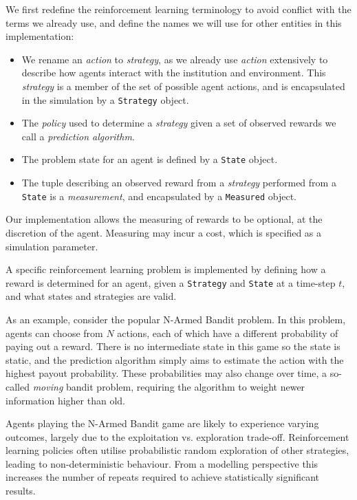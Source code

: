 We first redefine the reinforcement learning terminology to avoid conflict with the terms we already use, and define the names we will use for other entities in this implementation:
\begin{itemize}
\item We rename an \emph{action} to \emph{strategy}, as we already use \emph{action} extensively to describe how agents interact with the institution and environment. This \emph{strategy} is a member of the set of possible agent actions, and is encapsulated in the simulation by a \texttt{Strategy} object.
\item The \emph{policy} used to determine a \emph{strategy} given a set of observed rewards we call a \emph{prediction algorithm}.
\item The problem state for an agent is defined by a \texttt{State} object.
\item The tuple describing an observed reward from a \emph{strategy} performed from a \texttt{State} is a \emph{measurement}, and encapsulated by a \texttt{Measured} object.
\end{itemize}

Our implementation allows the measuring of rewards to be optional, at the
discretion of the agent. Measuring may incur a cost, which is specified as a
simulation parameter.

A specific reinforcement learning problem is implemented by defining how a
reward is determined for an agent, given a \texttt{Strategy} and
\texttt{State} at a time-step $t$, and what states and strategies are valid.

As an example, consider the popular N-Armed Bandit problem.
 In this problem, agents can choose from $N$
actions, each of which have a different probability of paying out a reward.
There is no intermediate state in this game so the state is static, and
the prediction algorithm simply aims to estimate the action with the highest
payout probability. These probabilities may also change over time, a so-called \emph{moving} bandit problem, requiring the
algorithm to weight newer information higher than old.

Agents playing the N-Armed Bandit game are likely to experience varying
outcomes, largely due to the exploitation vs. exploration trade-off.
Reinforcement learning policies often utilise probabilistic random exploration
of other strategies, leading to non-deterministic behaviour. From a modelling
perspective this increases the number of repeats required to achieve
statistically significant results.

